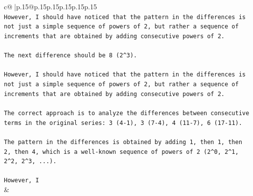 \documentclass{article}
\begin{document}
{\begin{supertabular}{c@{$\;$}|p{.15\linewidth}@{}p{.15\linewidth}p{.15\linewidth}p{.15\linewidth}p{.15\linewidth}p{.15\linewidth}}
{{{\\ 
\texttt{However, I should have noticed that the pattern in the differences is not just a simple sequence of powers of 2, but rather a sequence of increments that are obtained by adding consecutive powers of 2. } \\
\\ 
\texttt{The next difference should be 8 (2\^{}3). } \\
\\ 
\texttt{However, I should have noticed that the pattern in the differences is not just a simple sequence of powers of 2, but rather a sequence of increments that are obtained by adding consecutive powers of 2. } \\
\\ 
\texttt{The correct approach is to analyze the differences between consecutive terms in the original series: 3 (4{-}1), 3 (7{-}4), 4 (11{-}7), 6 (17{-}11). } \\
\\ 
\texttt{The pattern in the differences is obtained by adding 1, then 1, then 2, then 4, which is a well{-}known sequence of powers of 2 (2\^{}0, 2\^{}1, 2\^{}2, 2\^{}3, ...). } \\
\\ 
\texttt{However, I} \\
            }
        }
    }
    & \\ \\

\end{supertabular}
}
\end{document}
